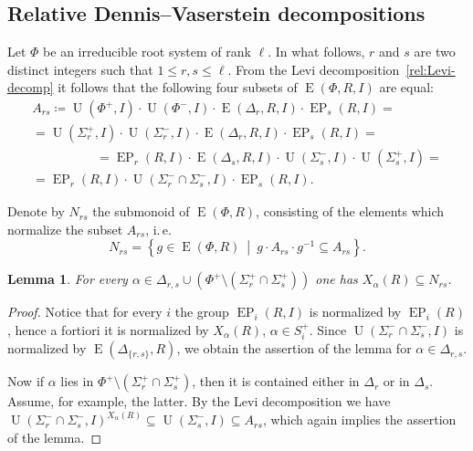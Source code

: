 \documentclass[11pt]{amsart}
\theoremstyle{plain}
\numberwithin{equation}{section}
\newtheorem{lemma}{Lemma}
\numberwithin{lemma}{section}
\theoremstyle{definition}
\theoremstyle{remark}
\DeclareMathOperator{\E}{E}
\DeclareMathOperator{\EP}{EP}
\DeclareMathOperator{\U}{U}
\begin{document}
\subsection{Relative Dennis--Vaserstein decompositions}\label{sec:dennis-vaserstein}
Let $\Phi$ be an irreducible root system of rank $\ell$.
In what follows, $r$ and $s$ are two distinct integers such that $1 \leqslant r, s \leqslant \ell$.
From the Levi decomposition~\eqref{rel:Levi-decomp} it follows that the following four subsets of $\E(\Phi, R, I)$ are equal:
\begin{multline*}
A_{rs} \coloneqq \U(\Phi^+, I)\cdot \U(\Phi^-, I) \cdot \E(\Delta_r, R, I) \cdot \EP_s(R, I) = \\
= \U(\Sigma_r^+, I)\cdot \U(\Sigma^-_r, I) \cdot \E(\Delta_r, R, I) \cdot \EP_s(R, I) = \hspace{5em} \\
\hspace{5em} = \EP_r(R, I) \cdot \E(\Delta_s, R, I) \cdot \U(\Sigma_s^-, I)\cdot \U(\Sigma_s^+, I) = \\
= \EP_r(R, I) \cdot \U(\Sigma^-_r \cap \Sigma^-_s, I) \cdot \EP_s(R, I).
\end{multline*}

Denote by $N_{rs}$ the submonoid of $\E(\Phi, R)$, consisting of the elements which normalize the subset $A_{rs}$, i.\,e.
\[ N_{rs} = \left\{ g\in \E(\Phi, R)\ \middle|\ g \cdot A_{rs} \cdot g^{-1} \subseteq A_{rs} \right\}. \]

\begin{lemma}\label{lemma:dv-normal} 
For every $\alpha \in \Delta_{r, s} \cup (\Phi^+ \setminus (\Sigma^+_r \cap \Sigma^+_s))$ one has $X_\alpha(R) \subseteq N_{rs}$. \end{lemma}
\begin{proof}
Notice that for every $i$ the group $\EP_i(R, I)$ is normalized by $\EP_i(R)$, hence a fortiori it is normalized by $X_\alpha(R)$, $\alpha \in S_i^+$.
Since $\U(\Sigma_r^- \cap \Sigma_s^-, I)$ is normalized by $\E(\Delta_{\{r, s\}}, R)$, we obtain the assertion of the lemma for $\alpha \in \Delta_{r, s}$.

Now if $\alpha$ lies in $\Phi^+ \setminus (\Sigma_r^+ \cap \Sigma_s^+)$, then it is contained either in $\Delta_r$ or in $\Delta_s$.
Assume, for example, the latter. By the Levi decomposition we have $\U(\Sigma_r^- \cap \Sigma_s^-, I)^{X_\alpha(R)} \subseteq \U(\Sigma_s^-, I) \subseteq A_{rs}$,
which again implies the assertion of the lemma.
\end{proof}
\end{document}
